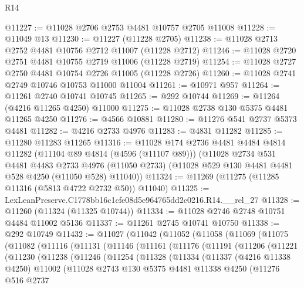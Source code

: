 \begin{lexlean}{R14}
\begin{coremodule}
@11227 := @11028 @2706 @2753 @4481 @10757 @2705 @11008
@11228 := @11049 @13
@11230 := @11227 (@11228 @2705)
@11238 := @11028 @2713 @2752 @4481 @10756 @2712 @11007 (@11228 @2712)
@11246 := @11028 @2720 @2751 @4481 @10755 @2719 @11006 (@11228 @2719)
@11254 := @11028 @2727 @2750 @4481 @10754 @2726 @11005 (@11228 @2726)
@11260 := @11028 @2741 @2749 @10746 @10753 @11000 @11004
@11261 := @10971 @957
@11264 := @11261 @2740 @10741 @10745
@11265 := @292 @10744
@11269 := @11264 (@4216 @11265 @4250) @11000
@11275 := @11028 @2738 @130 @5375 @4481 @11265 @4250
@11276 := @4566 @10881
@11280 := @11276 @541 @2737 @5373 @4481
@11282 := @4216 @2733 @4976
@11283 := @4831 @11282
@11285 := @11280 @11283 @11265
@11316 := @11028
    @174
    @2736
    @4481
    @4484
    @4814
    @11282
    (@11104 @89 @4814 (@4596 (@11107 @89)))
    (@11028
      @2734
      @531
      @4481
      @4483
      @2733
      @4976
      (@11050 @2733)
      (@11028 @529 @130 @4481 @4481 @528 @4250 (@11050 @528) @11040))
@11324 := @11269 (@11275 (@11285 @11316 (@5813 @4722 @2732 @50)) @11040)
@11325 := LexLeanPreserve.C1778bb16c1cfe08d5e964765dd2c0216.R14.__rel_27
@11328 := @11260 (@11324 (@11325 @10744))
@11334 := @11028 @2746 @2748 @10751 @4484 @11002 @5136
@11337 := @11261 @2745 @10741 @10750
@11338 := @292 @10749
@11432 := @11027
    (@11042
      (@11052
        (@11058
          (@11069
            (@11075
              (@11082
                (@11116
                  (@11131
                    (@11146
                      (@11161
                        (@11176
                          (@11191
                            (@11206
                              (@11221
                                (@11230
                                  (@11238
                                    (@11246
                                      (@11254
                                        (@11328
                                          (@11334
                                            (@11337
                                              (@4216 @11338 @4250)
                                              @11002
                                              (@11028
                                                @2743
                                                @130
                                                @5375
                                                @4481
                                                @11338
                                                @4250
                                                (@11276
                                                  @516
                                                  @2737

\end{coremodule}
\end{lexlean}
